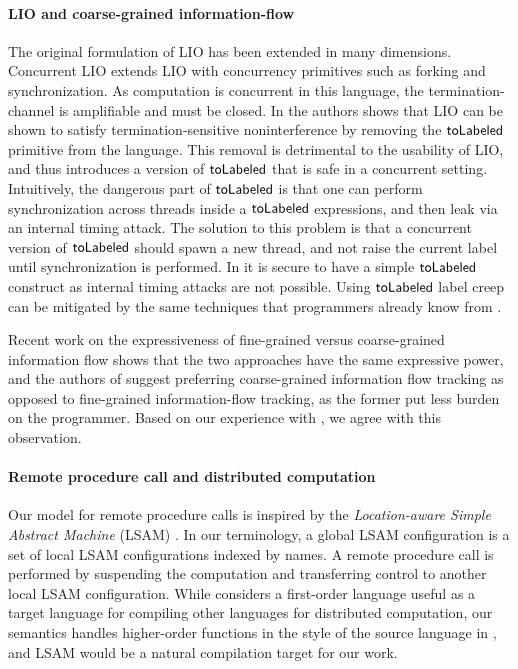 \paragraph{LIO and coarse-grained information-flow}
The original formulation of LIO \cite{SRMMlio} has been extended in many dimensions. Concurrent LIO \cite{Stefan:2012:ACT:2364527.2364557} extends LIO with concurrency primitives such as forking and synchronization. As computation is concurrent in this language, the termination-channel is amplifiable \cite{Askarov:2008:TNL:1462455.1462485} and must be closed. In \cite{Stefan:2012:ACT:2364527.2364557} the authors shows that LIO can be shown to satisfy termination-sensitive noninterference by removing the $\mathsf{toLabeled}$ primitive from the language. This removal is detrimental to the usability of LIO, and thus \cite{Stefan:2012:ACT:2364527.2364557} introduces a version of $\mathsf{toLabeled}$ that is safe in a concurrent setting. Intuitively, the dangerous part of $\mathsf{toLabeled}$ is that one can perform synchronization across threads inside a $\mathsf{toLabeled}$ expressions, and then leak via an internal timing attack. The solution to this problem is that a concurrent version of $\mathsf{toLabeled}$ should spawn a new thread, and not raise the current label until synchronization is performed. In \lang{} it is secure to have a simple $\mathsf{toLabeled}$ construct as internal timing attacks are not possible. Using $\mathsf{toLabeled}$ label creep can be mitigated by the same techniques that programmers already know from \cite{SRMMlio}.

Recent work \cite{Rajani2018} on the expressiveness of fine-grained versus coarse-grained information flow shows that the two approaches have the same expressive power, and the authors of \cite{Rajani2018} suggest preferring coarse-grained information flow tracking as opposed to fine-grained information-flow tracking, as the former put less burden on the programmer. Based on our experience with \lang{}, we agree with this observation.

\paragraph{Remote procedure call and distributed computation}
Our model for remote procedure calls is inspired by the \emph{Location-aware Simple Abstract Machine} (LSAM) \cite{10.1007/978-3-642-25462-8_28}. In our terminology, a global LSAM configuration is a set of local LSAM configurations indexed by names. A remote procedure call is performed by suspending the computation and transferring control to another local LSAM configuration. While \cite{10.1007/978-3-642-25462-8_28} considers a first-order language useful as a target language for compiling other languages for distributed computation, our semantics handles higher-order functions in the style of the source language in \cite{Cooper:2009:RC:1599410.1599439}, and LSAM would be a natural compilation target for our work.